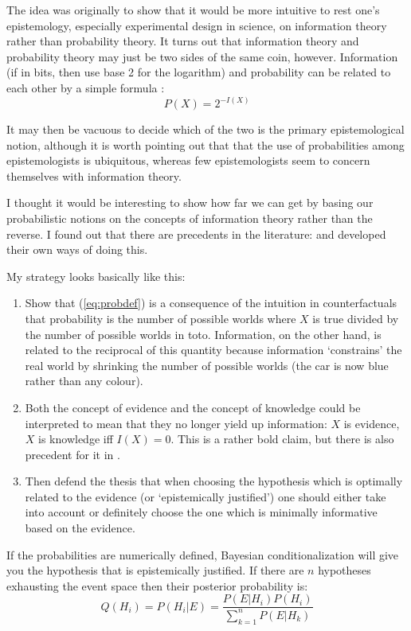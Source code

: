 \documentclass[11pt]{article}
\begin{document}
The idea was originally to show that it would be more intuitive to
rest one's epistemology, especially experimental design in science, on
information theory rather than probability theory. It turns out that
information theory and probability theory may just be two sides of the
same coin, however. Information (if in bits, then use base 2 for the
logarithm) and probability can be related to each other by a simple
formula \citep[37]{guiasu77}:
\begin{equation}
  P(X)={2^{-I(X)}}
\label{eq:probdef}
\end{equation}

It may then be vacuous to decide which of the two is the primary
epistemological notion, although it is worth pointing out that
that the use of probabilities among epistemologists is ubiquitous,
whereas few epistemologists seem to concern themselves with
information theory.

I thought it would be interesting to show how far we can get by basing
our probabilistic notions on the concepts of information theory rather
than the reverse. I found out that there are precedents in the
literature: \citep{ingardenurbanik62} and \citep{kampe67} developed
their own ways of doing this. 

My strategy looks basically like this:
\begin{enumerate}
\item Show that ({\ref{eq:probdef}}) is a consequence of the intuition
  in counterfactuals that probability is the number of possible worlds
  where $X$ is true divided by the number of possible worlds in toto.
  Information, on the other hand, is related to the reciprocal of this
  quantity because information `constrains' the real world by
  shrinking the number of possible worlds (the car is now blue rather
  than any colour).
\item Both the concept of evidence and the concept of knowledge could
  be interpreted to mean that they no longer yield up information: $X$
  is evidence, $X$ is knowledge iff $I(X)=0$. This is a rather bold
  claim, but there is also precedent for it in \citep{williamson00}.
\item Then defend the thesis that when choosing the hypothesis which
  is optimally related to the evidence (or `epistemically justified')
  one should either take into account or definitely choose the one
  which is minimally informative based on the evidence.
\end{enumerate}

If the probabilities are numerically defined, Bayesian
conditionalization will give you the hypothesis that is epistemically
justified. If there are $n$ hypotheses exhausting the event
space then their posterior probability is:
\begin{equation}
  \label{eq:bayes}
Q(H_{i})=P(H_{i}|E)=\frac{P(E|H_{i})P(H_{i})}{\sum_{k=1}^{n}P(E|H_{k})}  
\end{equation}
\end{document}

